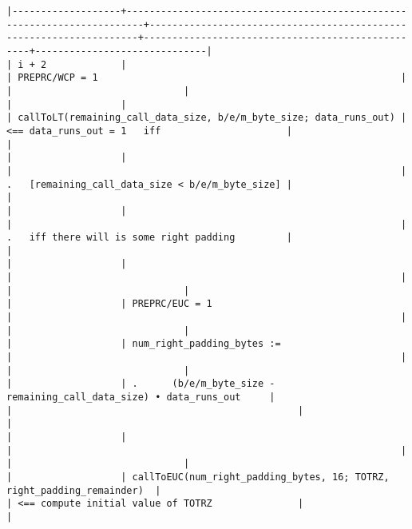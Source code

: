 \documentclass[varwidth=\maxdimen,margin=0.5cm,multi={verbatim}]{standalone}
\begin{document}
\begin{verbatim}
|-------------------+-------------------------------------------------------------------------+--------------------------------------------------------------------+--------------------------------------------------+------------------------------|
| i + 2             |                                                                         | PREPRC/WCP = 1                                                     |                                                  |                              |
|                   |                                                                         | callToLT(remaining_call_data_size, b/e/m_byte_size; data_runs_out) | <== data_runs_out = 1   iff                      |                              |
|                   |                                                                         |                                                                    | .   [remaining_call_data_size < b/e/m_byte_size] |                              |
|                   |                                                                         |                                                                    | .   iff there will is some right padding         |                              |
|                   |                                                                         |                                                                    |                                                  |                              |
|                   | PREPRC/EUC = 1                                                          |                                                                    |                                                  |                              |
|                   | num_right_padding_bytes :=                                              |                                                                    |                                                  |                              |
|                   | .      (b/e/m_byte_size - remaining_call_data_size) • data_runs_out     |                                                                    |                                                  |                              |
|                   |                                                                         |                                                                    |                                                  |                              |
|                   | callToEUC(num_right_padding_bytes, 16; TOTRZ, right_padding_remainder)  |                                                                    | <== compute initial value of TOTRZ               |                              |

\end{verbatim}
\end{document}
